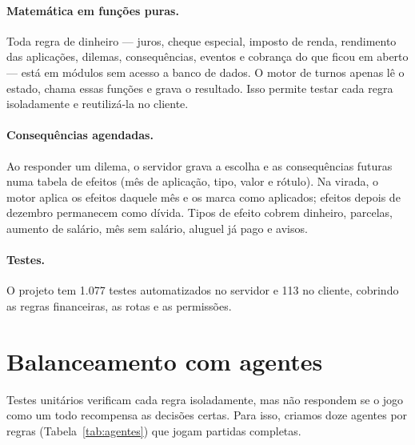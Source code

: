 \documentclass[11pt,a4paper]{article}
\begin{document}
\paragraph{Matemática em funções puras.} Toda regra de dinheiro --- juros, cheque especial, imposto de renda, rendimento das aplicações, dilemas, consequências, eventos e cobrança do que ficou em aberto --- está em módulos sem acesso a banco de dados. O motor de turnos apenas lê o estado, chama essas funções e grava o resultado. Isso permite testar cada regra isoladamente e reutilizá-la no cliente.

\paragraph{Consequências agendadas.} Ao responder um dilema, o servidor grava a escolha e as consequências futuras numa tabela de efeitos (mês de aplicação, tipo, valor e rótulo). Na virada, o motor aplica os efeitos daquele mês e os marca como aplicados; efeitos depois de dezembro permanecem como dívida. Tipos de efeito cobrem dinheiro, parcelas, aumento de salário, mês sem salário, aluguel já pago e avisos.

\paragraph{Testes.} O projeto tem 1.077 testes automatizados no servidor e 113 no cliente, cobrindo as regras financeiras, as rotas e as permissões. %

\section{Balanceamento com agentes}
\label{sec:metodo}

Testes unitários verificam cada regra isoladamente, mas não respondem se o jogo como um todo recompensa as decisões certas. Para isso, criamos doze agentes por regras (Tabela~\ref{tab:agentes}) que jogam partidas completas.
\end{document}
